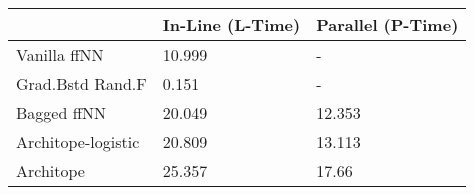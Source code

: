 \begin{tabular}{lll}
\toprule
{} & In-Line (L-Time) & Parallel (P-Time) \\
\midrule
Vanilla ffNN       &           10.999 &                 - \\
Grad.Bstd Rand.F   &            0.151 &                 - \\
Bagged ffNN        &           20.049 &            12.353 \\
Architope-logistic &           20.809 &            13.113 \\
Architope          &           25.357 &             17.66 \\
\bottomrule
\end{tabular}
